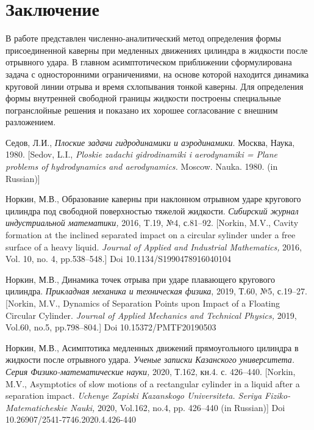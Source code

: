 \documentclass[press]{vestnik}
\begin{document}
\section*{Заключение}

В работе представлен численно-аналитический метод определения формы 
присоединенной каверны при медленных движениях цилиндра в жидкости после 
отрывного удара. В главном асимптотическом приближении сформулирована задача 
с односторонними ограничениями, на основе которой находится динамика 
круговой линии отрыва и время схлопывания тонкой каверны. Для определения 
формы внутренней свободной границы жидкости построены специальные 
погранслойные решения и показано их хорошее согласование с внешним 
разложением. 

\begin{thebibliography}{10}
Седов, Л.И., \textit{Плоские задачи гидродинамики и аэродинамики}. Москва, Наука, 1980. [Sedov, L.I., \textit{Ploskie zadachi gidrodinamiki i aerodynamiki = Plane problems of hydrodynamics and aerodynamics.} Moscow. Nauka. 1980. (in Russian)]

Норкин, М.В., Образование каверны при наклонном отрывном ударе кругового цилиндра под свободной поверхностью тяжелой жидкости. \textit{Сибирский журнал индустриальной математики,} 2016, T.19, №4, с.81--92. [Norkin, M.V., Cavity formation at the inclined separated impact on a circular sylinder under a free surface of a heavy liquid. \textit{Journal of Applied and Industrial Mathematics,} 2016, Vol. 10, no. 4, pp.538--548.] Doi 10.1134/S1990478916040104

Норкин, М.В., Динамика точек отрыва при ударе плавающего кругового цилиндра. \textit{Прикладная механика и техническая физика}, 2019, Т.60, №5, с.19--27. [Norkin, M.V., Dynamics of Separation Points upon Impact of a Floating Circular Cylinder. \textit{Journal of Applied Mechanics and Technical Physics, }2019, \quad Vol.60, no.5, pp.798--804.] Doi 10.15372/PMTF20190503

Норкин, М.В., Асимптотика медленных движений прямоугольного цилиндра в жидкости после отрывного удара.\textit{ Ученые записки Казанского университета. Серия Физико-математические науки, }2020, Т.162, кн.4. с. 426--440. [Norkin, M.V., Asymptotics of slow motions of a rectangular cylinder in a liquid after a separation impact. \textit{Uchenye Zapiski Kazanskogo Universiteta. Seriya Fiziko-Matematicheskie Nauki,} 2020, Vol.162, no.4, pp. 426--440 (in Russian)] Doi 10.26907/2541-7746.2020.4.426-440


\end{thebibliography}
\end{document}

